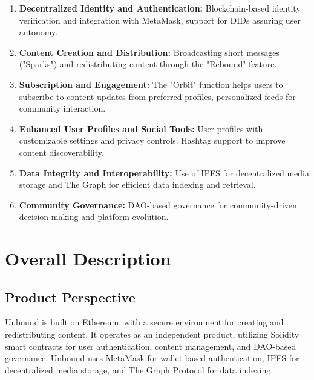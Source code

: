 \documentclass[a4paper,12pt]{article}
\begin{document}
\begin{enumerate}
    \item \textbf{Decentralized Identity and Authentication:}
         Blockchain-based identity verification and integration with MetaMask, support for DIDs assuring user autonomy.
    
    \item \textbf{Content Creation and Distribution:}
         Broadcasting short messages ("Sparks") and redistributing content through the "Rebound" feature.
    
    \item \textbf{Subscription and Engagement:}
         The "Orbit" function helps users to subscribe to content updates from preferred profiles,
        personalized feeds for community interaction.
    
    \item \textbf{Enhanced User Profiles and Social Tools:}
         User profiles with customizable settings and privacy controls. Hashtag support to improve content discoverability.
    
    \item \textbf{Data Integrity and Interoperability:}
         Use of IPFS for decentralized media storage and The Graph for efficient data indexing and retrieval.
    
    \item \textbf{Community Governance:}
         DAO-based governance for community-driven decision-making and platform evolution.
\end{enumerate}

\section{Overall Description}

\subsection{Product Perspective}

Unbound is built on Ethereum, with a secure environment for creating and redistributing content. It operates as an independent product, utilizing Solidity smart contracts for user authentication, content management, and DAO-based governance. Unbound uses MetaMask for wallet-based authentication, IPFS for decentralized media storage, and The Graph Protocol for data indexing. 
\end{document}
